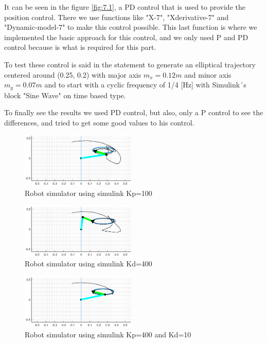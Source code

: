 It can be seen in the figure \eqref{fig:7.1}, a PD control that is used to provide the position control. There we use functions like "X-7", "Xderivative-7" and "Dynamic-model-7" to make this control possible. This last function is where we implemented the basic approach for this control, and we only used P and PD control because is what is required for this part.

To test these control is said in the statement to generate an elliptical trajectory centered around (0.25, 0.2) with major axis $m_x = 0.12m$ and minor axis $m_y = 0.07m$ and to start with a cyclic frequency of 1/4 [Hz] with Simulink´s block "Sine Wave" on time based type.

To finally see the results we used PD control, but also, only a P control to see the differences, and tried to get some good values to his control. 

\begin{figure}[H]
    \centering
    \includegraphics[width=0.49\textwidth]{imgs/7.2.eps}
    \caption{Robot simulator using simulink Kp=100}
    \label{fig:7.2}
\end{figure}

\begin{figure}[H]
    \centering
    \includegraphics[width=0.49\textwidth]{imgs/7.3.eps}
    \caption{Robot simulator using simulink Kd=400}
    \label{fig:7.3}
\end{figure}

\begin{figure}[H]
    \centering
    \includegraphics[width=0.49\textwidth]{imgs/7.4.eps}
    \caption{Robot simulator using simulink Kp=400 and Kd=10}
    \label{fig:7.4}
\end{figure}

